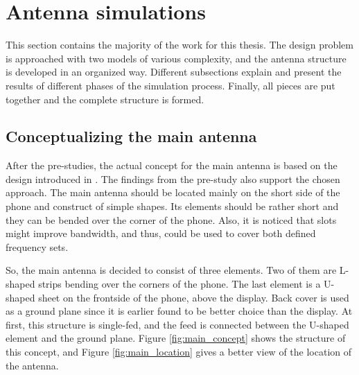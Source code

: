 \section{Antenna simulations}
\label{sec:simulations}
This section contains the majority of the work for this thesis. The design problem is approached with two models of various complexity, and the antenna structure is developed in an organized way. Different subsections explain and present the results of different phases of the simulation process. Finally, all pieces are put together and the complete structure is formed.


\subsection{Conceptualizing the main antenna}
\label{sec:conceptualizing}
After the pre-studies, the actual concept for the main antenna is based on the design introduced in \cite{kimmo}. The findings from the pre-study also support the chosen approach. The main antenna should be located mainly on the short side of the phone and construct of simple shapes. Its elements should be rather short and they can be bended over the corner of the phone. Also, it is noticed that slots might improve bandwidth, and thus, could be used to cover both defined frequency sets. 

So, the main antenna is decided to consist of three elements. Two of them are L-shaped strips bending over the corners of the phone. The last element is a U-shaped sheet on the frontside of the phone, above the display. Back cover is used as a ground plane since it is earlier found to be better choice than the display. At first, this structure is single-fed, and the feed is connected between the U-shaped element and the ground plane. Figure \ref{fig:main_concept} shows the structure of this concept, and Figure \ref{fig:main_location} gives a better view of the location of the antenna.

